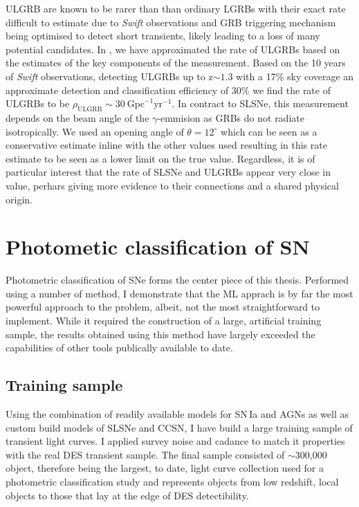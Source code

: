 ULGRB are known to be rarer than than ordinary LGRBs with their exact rate difficult to estimate due to \textit{Swift} observations and GRB triggering mechanism being optimised to detect short transients, likely leading to a loss of many potential candidates. In \citet{Prajs2016}, we have approximated the rate of ULGRBs based on the estimates of the key components of the measurement. Based on the 10 years of \textit{Swift} observations, detecting ULGRBs up to z$\sim1.3$ with a 17\% sky coverage an approximate detection and classification efficiency of 30\% we find the rate of ULGRBs to be $\rho_{\mathrm{ULGRB}} \sim 30~\mathrm{Gpc}^{-1} \mathrm{yr}^{-1}$. In contract to SLSNe, this measurement depends on the beam angle of the $\gamma$-emmision as GRBs do not radiate isotropically. We used an opening angle of $\theta=12^\circ$ which can be seen as a conservative estimate inline with the other values used resulting in this rate estimate to be seen as a lower limit on the true value. Regardless, it is of particular interest that the rate of SLSNe and ULGRBs appear very close in value, perhars giving more evidence to their connections and a shared physical origin. 

\section{Photometic classification of SN}
Photometric classification of SNe forms the center piece of this thesis. Performed using a number of method, I demonstrate that the ML apprach is by far the most powerful approach to the problem, albeit, not the most straightforward to implement. While it required the construction of a large, artificial training sample, the results obtained using this method have largely exceeded the capabilities of other tools publically available to date.

\subsection{Training sample}
Using the combination of readily available models for SN\,Ia and AGNs as well as custom build models of SLSNe and CCSN, I have build a large training sample of transient light curves. I applied survey noise and cadance to match it properties with the real DES transient sample. The final sample consisted of $\sim$300,000 object, therefore being the largest, to date, light curve collection used for a photometric classification study and represents objects from low redshift, local objects to those that lay at the edge of DES detectibility.

